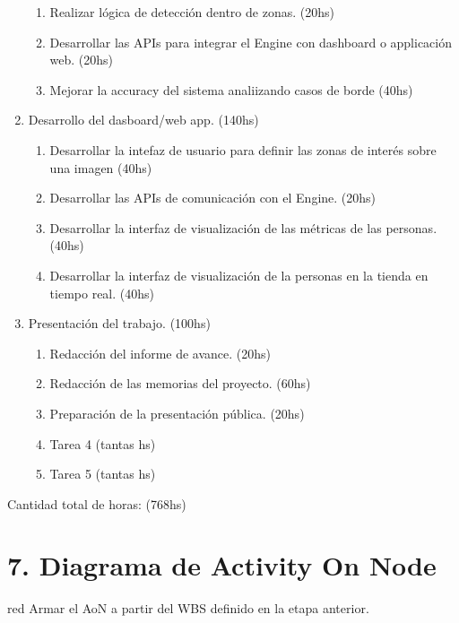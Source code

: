 \documentclass[11pt]{charter}
\begin{document}
\begin{enumerate}
\begin{enumerate}
	\item Realizar lógica de detección dentro de zonas. (20hs)
	\item Desarrollar las APIs para integrar el Engine con dashboard o applicación web. (20hs)
	\item Mejorar la accuracy del sistema analiizando casos de borde (40hs)	
	\end{enumerate}
\item Desarrollo del dasboard/web app. (140hs)
	\begin{enumerate}
	\item Desarrollar la intefaz de usuario para definir las zonas de interés sobre una imagen (40hs)
	\item Desarrollar las APIs de comunicación con el Engine. (20hs)
	\item Desarrollar la interfaz de visualización de las métricas de las personas. (40hs)
	\item Desarrollar la interfaz de visualización de la personas en la tienda en tiempo real. (40hs)
	\end{enumerate}
\item Presentación del trabajo. (100hs)
	\begin{enumerate}
	\item Redacción del informe de avance. (20hs)
	\item Redacción de las memorias del proyecto. (60hs)
	\item Preparación de la presentación pública. (20hs)
	\item Tarea 4 (tantas hs)
	\item Tarea 5 (tantas hs)
	\end{enumerate}
\end{enumerate}

Cantidad total de horas: (768hs)


\section{7. Diagrama de Activity On Node}
\label{sec:AoN}

\begin{consigna}{red}
Armar el AoN a partir del WBS definido en la etapa anterior. 



\end{consigna}
\end{document}
